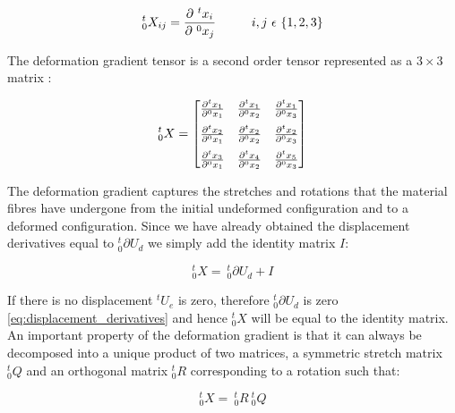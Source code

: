 \begin{equation}
^t_0X_{ij} = \frac{\partial \ ^tx_i}{\partial \ ^0x_j} \hspace{10mm}
i,j \ \epsilon \ \lbrace 1,2,3 \rbrace
\end{equation}

The deformation gradient tensor is a second order tensor represented
as a $3 \times 3$ matrix :

\begin{equation}
^t_0X =
\begin{bmatrix} 
  \frac{\partial ^t x_1}{\partial ^0 x_1} & 
  \frac{\partial ^t x_1}{\partial ^0 x_2} & 
  \frac{\partial ^t x_1}{\partial ^0 x_3}
\vspace{2mm} \\
  \frac{\partial ^t x_2}{\partial ^0 x_1} & 
  \frac{\partial ^t x_2}{\partial ^0 x_2} & 
  \frac{\partial ^t x_2}{\partial ^0 x_3}
\vspace{2mm} \\
  \frac{\partial ^t x_3}{\partial ^0 x_1} & 
  \frac{\partial ^t x_4}{\partial ^0 x_2} & 
  \frac{\partial ^t x_5}{\partial ^0 x_3} 
\end{bmatrix} 
\end{equation}

The deformation gradient captures the stretches and rotations that
the material fibres have undergone from the initial undeformed
configuration and to a deformed configuration.
Since we have already obtained the displacement derivatives equal to
$^t_0\partial U_d$ we simply add the identity
matrix $I$:

\begin{equation}
\label{eq:deformation_gradient_tensor}
^t_0X = \ ^t_0\partial U_d + I
\end{equation}

If there is no displacement $^tU_e$ is zero, therefore $^t_0\partial U_d$
is zero \eqref{eq:displacement_derivatives} and hence $^t_0X$ will be equal
to the identity matrix. 
An important property of the deformation gradient is that it can
always be decomposed into a unique product of two matrices, a
symmetric stretch matrix $^t_0Q$ and an orthogonal matrix $^t_0R$
corresponding to a rotation such that:

\begin{equation}
^t_0X = \ ^t_0R \ ^t_0Q
\end{equation}

